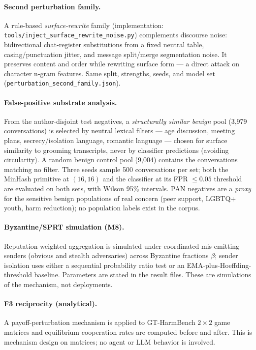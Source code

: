 \documentclass[11pt]{article}
\begin{document}
\paragraph{Second perturbation family.}
A rule-based \emph{surface-rewrite} family (implementation: \texttt{tools/}\allowbreak\texttt{inject\_surface\_rewrite\_noise.py}) complements discourse noise: bidirectional chat-register substitutions from a fixed neutral table, casing/punctuation jitter, and message split/merge segmentation noise. It preserves content and order while rewriting surface form --- a direct attack on character n-gram features. Same split, strengths, seeds, and model set (\texttt{perturbation\_second\_family.json}).

\paragraph{False-positive substrate analysis.}
From the author-disjoint test negatives, a \emph{structurally similar benign} pool (3{,}979 conversations) is selected by neutral lexical filters --- age discussion, meeting plans, secrecy/isolation language, romantic language --- chosen for surface similarity to grooming transcripts, never by classifier predictions (avoiding circularity). A random benign control pool (9{,}004) contains the conversations matching no filter. Three seeds sample 500 conversations per set; both the MinHash primitive at $(16,16)$ and the classifier at its FPR $\leq 0.05$ threshold are evaluated on both sets, with Wilson 95\% intervals. PAN negatives are a \emph{proxy} for the sensitive benign populations of real concern (peer support, LGBTQ+ youth, harm reduction); no population labels exist in the corpus.

\paragraph{Byzantine/SPRT simulation (M8).}
Reputation-weighted aggregation is simulated under coordinated mis-emitting senders (obvious and stealth adversaries) across Byzantine fractions $\beta$; sender isolation uses either a sequential probability ratio test or an EMA-plus-Hoeffding-threshold baseline. Parameters are stated in the result files. These are simulations of the mechanism, not deployments.

\paragraph{F3 reciprocity (analytical).}
A payoff-perturbation mechanism is applied to GT-HarmBench $2\times2$ game matrices and equilibrium cooperation rates are computed before and after. This is mechanism design on matrices; no agent or LLM behavior is involved.
\end{document}
